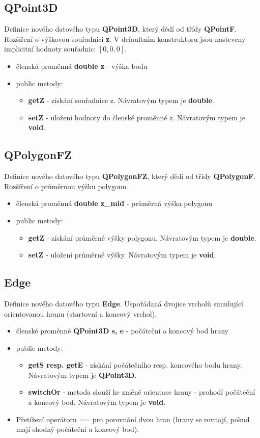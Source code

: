 \documentclass[a4paper, 12pt]{article}
\begin{document}
\subsection{QPoint3D}
Definice nového datového typu \textbf{QPoint3D}, který dědí od třídy \textbf{QPointF}. Rozšíření o výškovou souřadnici \textbf{z}. V defaultním konstruktoru jsou nasteveny implicitní hodnoty souřadnic: $[0,0,0]$.
\begin{itemize}
	\item členská proměnná \textbf{double z} - výška bodu
	\item public metody:
	\begin{itemize}
		\item \textbf{getZ} - získání souřadnice z. Návratovým typem je \textbf{double}. 
		\item \textbf{setZ} - uložení hodnoty do členské proměnné z. Návratovým typem je \textbf{void}. 
	\end{itemize}
\end{itemize}
\subsection{QPolygonFZ}
Definice nového datového typu \textbf{QPolygonFZ}, který dědí od třídy \textbf{QPolygonF}. Rozšíření o průměrnou výšku polygonu.
\begin{itemize}
	\item členská proměnná \textbf{double z_mid} - průměrná výška polygonu
	\item public metody:
	\begin{itemize}
		\item \textbf{getZ} - získání průměrné výšky polygonu. Návratovým typem je \textbf{double}.
		\item \textbf{setZ} - uložení průměrné výšky. Návratovým typem je \textbf{void}.
	\end{itemize}
\end{itemize}

\subsection{Edge}
Definice nového datového typu \textbf{Edge}. Uspořádaná dvojice vrcholů simulující orientovanou hranu (startovní a koncový vrchol).

\begin{itemize}
	\item členské proměnné \textbf{QPoint3D s, e} - počáteční a koncový bod hrany
	\item public metody:
	\begin{itemize}
		\item \textbf{getS resp. getE} - získání počátečního resp. koncového bodu hrany. Návratovým typem je \textbf{QPoint3D}. 
		\item \textbf{switchOr} - metoda slouží ke změně orientace hrany - prohodí počáteční a koncový bod. Návratovým typem je \textbf{void}. 
	\end{itemize}
	\item Přetížení operátoru == pro porovnání dvou hran (hrany se rovnají, pokud mají shodný počáteční a koncový bod).
\end{itemize}
\end{document}
